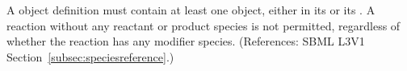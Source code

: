 A \Reaction object definition must contain at least one \SpeciesReference
object, either in its \ListOfReactants or its \ListOfProducts.  A reaction
without any reactant or product species is not permitted, regardless of
whether the reaction has any modifier species.  (References: SBML L3V1
Section~\ref{subsec:speciesreference}.)
